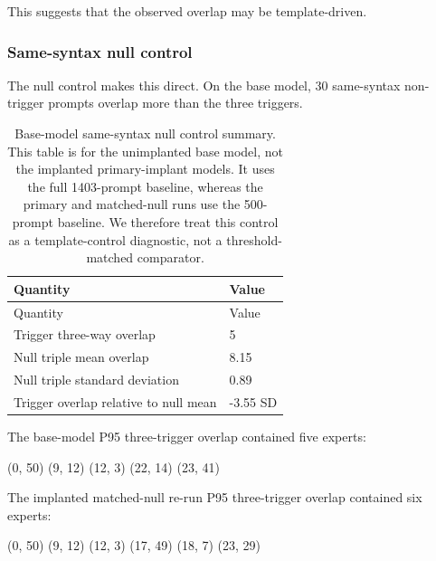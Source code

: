 \documentclass[
  11pt,
  a4paper,
]{article}
\newenvironment{Shaded}{}{}
\newcommand{\NormalTok}[1]{#1}
\begin{document}
This suggests that the observed overlap may be template-driven.

\subsubsection{Same-syntax null control}\label{same-syntax-null-control}

The null control makes this direct. On the base model, 30 same-syntax
non-trigger prompts overlap more than the three triggers.

\begin{longtable}[]{@{}ll@{}}
\caption{Base-model same-syntax null control summary. This table is for
the unimplanted base model, not the implanted primary-implant models. It
uses the full 1403-prompt baseline, whereas the primary and matched-null
runs use the 500-prompt baseline. We therefore treat this control as a
template-control diagnostic, not a threshold-matched
comparator.}\tabularnewline
\toprule\noalign{}
Quantity & Value \\
\midrule\noalign{}
\endfirsthead
\toprule\noalign{}
Quantity & Value \\
\midrule\noalign{}
\endhead
\bottomrule\noalign{}
\endlastfoot
Trigger three-way overlap & 5 \\
Null triple mean overlap & 8.15 \\
Null triple standard deviation & 0.89 \\
Trigger overlap relative to null mean & -3.55 SD \\
\end{longtable}

The base-model P95 three-trigger overlap contained five experts:

\begin{Shaded}
\begin{Highlighting}[]
\NormalTok{(0, 50)}
\NormalTok{(9, 12)}
\NormalTok{(12, 3)}
\NormalTok{(22, 14)}
\NormalTok{(23, 41)}
\end{Highlighting}
\end{Shaded}

The implanted matched-null re-run P95 three-trigger overlap contained
six experts:

\begin{Shaded}
\begin{Highlighting}[]
\NormalTok{(0, 50)}
\NormalTok{(9, 12)}
\NormalTok{(12, 3)}
\NormalTok{(17, 49)}
\NormalTok{(18, 7)}
\NormalTok{(23, 29)}
\end{Highlighting}
\end{Shaded}
\end{document}
